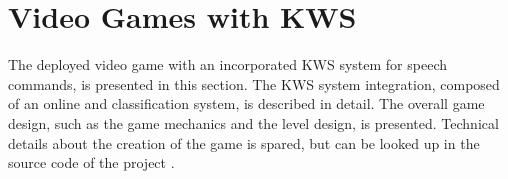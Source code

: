 
\chapter{Video Games with KWS}\label{sec:game}
The deployed video game with an incorporated KWS system for speech commands, is presented in this section.
The KWS system integration, composed of an online and classification system, is described in detail.
The overall game design, such as the game mechanics and the level design, is presented.
Technical details about the creation of the game is spared, but can be looked up in the source code of the project \cite{KWSGame}.



